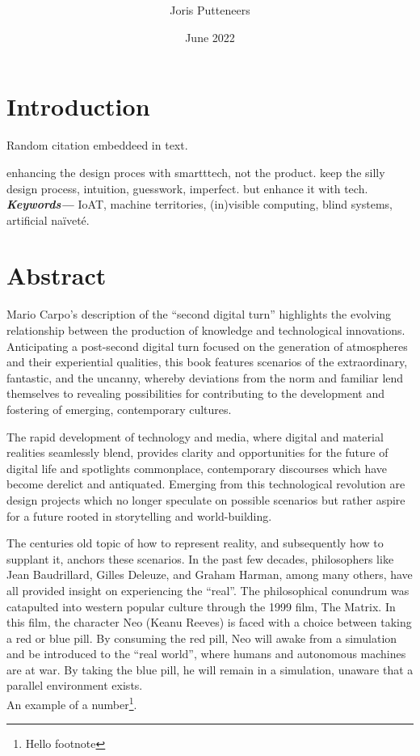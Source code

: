 \documentclass{article}
\title{\textbf{\xs}}
\author{Joris Putteneers}
\date{June 2022}
\newcommand\z{black} %
\newcommand\w{blue} %
\newcommand\q{white} %
\providecommand{\keywords}[1]
{
  \small	
  \textbf{\textit{Keywords---}} #1
}
\begin{document}
\color{\z}
\pagecolor{\q}

\pagestyle{plain} %

\maketitle
\tableofcontents

\section*{Introduction}
Random citation \cite{DUMMY:1} embeddeed in text.


enhancing the design proces with smartttech, not the product.
keep the silly design process, intuition, guesswork, imperfect. but enhance it with tech. \\


\keywords{{\color{\w}IoAT, machine territories, (in)visible computing, blind systems, artificial naïveté.}}

\section{Abstract}
Mario Carpo's description of the “second digital turn” highlights the evolving relationship between the production of knowledge and technological innovations. Anticipating a post-second digital turn focused on the generation of atmospheres and their experiential qualities, this book features scenarios of the extraordinary, fantastic, and the uncanny, whereby deviations from the norm and familiar lend themselves to revealing possibilities for contributing to the development and fostering of emerging, contemporary cultures.



The rapid development of technology and media, where digital and material realities seamlessly blend, provides clarity and opportunities for the future of digital life and spotlights commonplace, contemporary discourses which have become derelict and antiquated. Emerging from this technological revolution are design projects which no longer speculate on possible scenarios but rather aspire for a future rooted in storytelling and world-building. 


The centuries old topic of how to represent reality, and subsequently how to supplant it, anchors these scenarios. In the past few decades, philosophers like Jean Baudrillard, Gilles Deleuze, and Graham Harman, among many others, have all provided insight on experiencing the “real”. The philosophical conundrum was catapulted into western popular culture through the 1999 film, The Matrix. In this film, the character Neo (Keanu Reeves) is faced with a choice between taking a red or blue pill. By consuming the red pill, Neo will awake from a simulation and be introduced to the “real world”, where humans and autonomous machines are at war. By taking the blue pill, he will remain in a simulation, unaware that a parallel environment exists. \\
An example of a number\footnote{\label{myfootnote}Hello footnote}.
\end{document}

